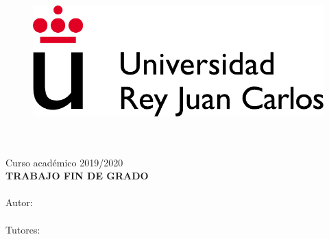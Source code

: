 \documentclass[
12pt, %
spanish, %
onehalfspacing, %
parskip, %
headsepline, %
]{MastersDoctoralThesis} %
\author{José Miguel García Benayas} %
\begin{document}
\frontmatter %

\pagestyle{plain} %


\begin{titlepage}
\begin{center}

\vspace*{.01\textheight}
\begin{figure}
\begin{center}
\includegraphics[scale=0.8]{Figures/URJC_logo.pdf}
\end{center}
\end{figure}
{\Large \MakeUppercase{\facname}}\\[0.5cm]
{\large \MakeUppercase{\degreename}}\\[0.5cm] %
{\large Curso académico 2019/2020}\\[1.5cm] %
{\large \textbf{TRABAJO FIN DE GRADO}}\\[0.5cm] %

{\Large \textbf{\MakeUppercase{\ttitle}}}\\[5cm] %

{\normalsize Autor:\\{\authorname}}\\[0.5cm]  %

{\normalsize Tutores:\\{\supname}}\\ %


\end{center}
\end{titlepage}
\end{document}
